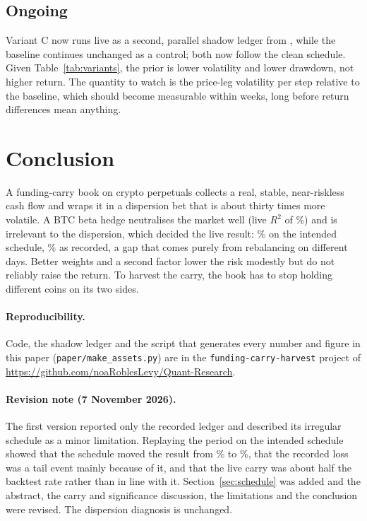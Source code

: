 \documentclass[11pt,a4paper]{article}
\begin{document}
\subsection{Ongoing}

Variant C now runs live as a second, parallel shadow ledger from \LiveEnd{}, while the
baseline continues unchanged as a control; both now follow the clean schedule. Given Table~\ref{tab:variants}, the prior is
lower volatility and lower drawdown, not higher return. The quantity to watch is the
price-leg volatility per step relative to the baseline, which should become measurable
within weeks, long before return differences mean anything.

\section{Conclusion}

A funding-carry book on crypto perpetuals collects a real, stable, near-riskless cash
flow and wraps it in a dispersion bet that is about thirty times more volatile. A BTC
beta hedge neutralises the market well (live $R^2$ of \LiveRsqBtc\%) and is irrelevant
to the dispersion, which decided the live result: \CleanTotal\% on the intended
schedule, \LiveTotal\% as recorded, a gap that comes purely from rebalancing on
different days. Better weights and a second factor lower the risk modestly but do not
reliably raise the return. To harvest the carry, the book has to stop holding different
coins on its two sides.

\paragraph{Reproducibility.} Code, the shadow ledger and the script that generates
every number and figure in this paper (\texttt{paper/make\_assets.py}) are in the
\texttt{funding-carry-harvest} project of
\url{https://github.com/noaRoblesLevy/Quant-Research}.

\paragraph{Revision note (7 November 2026).} The first version reported only the
recorded ledger and described its irregular schedule as a minor limitation. Replaying
the period on the intended schedule showed that the schedule moved the result from
\CleanTotal\% to \LiveTotal\%, that the recorded loss was a tail event mainly because
of it, and that the live carry was about half the backtest rate rather than in line
with it. Section~\ref{sec:schedule} was added and the abstract, the carry and
significance discussion, the limitations and the conclusion were revised. The
dispersion diagnosis is unchanged.
\end{document}
